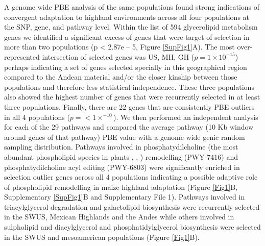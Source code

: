 \documentclass[9pt,twocolumn,twoside,lineno]{gsajnl}
\begin{document}
A genome wide PBE analysis of the same populations \cite{Wang2020-mp} found strong indications of convergent adaptation to highland environments across all four populations at the SNP, gene, and pathway level.
Within the list of 594 glycerolipid metabolism genes we identified a significant excess of genes that were target of selection in more than two populations (p < 2.87e – 5, Figure \ref{SupFig1}A).  
The most over-represented intersection of selected genes was US, MH, GH ($p = 1  \times 10 ^{-15} $) perhaps indicating a set of genes selected specially in this geographical region compared to the Andean material and/or the closer kinship between those populations and therefore less statistical independence. 
These three populations also showed the highest number of genes that were recurrently selected in at least three populations.
Finally, there are 22 genes that are consistently PBE outliers in all 4 populations ($p =<1  \times  ^{-10}$). 
We then performed an independent analysis for each of the 29 pathways and compared the average pathway (10 Kb window around genes of that pathway) PBE value with a genome wide genic random sampling distribution. 
Pathways involved in phosphatydilcholine (the most abundant phospholipid species in plants \citep{Gu2017-nd}, \citep{Poincelot1976-qe}, \citep{Hawke1974-ab}) remodelling (PWY-7416) and phosphatydilcholine acyl editing (PWY-6803) were significantly enriched in selection outlier genes across all 4 populations indicating a possible adaptive role of phospholipid remodelling in maize highland adaptation (Figure \ref{Fig1}B, Supplementary \ref{SupFig1}B and Supplementary File 1). 
Pathways involved in triacylglycerol degradation and galactolipid biosynthesis were recurrently selected in the SWUS, Mexican Highlands and the Andes while others involved in sulpholipid and diacylglycerol and phosphatidylglycerol biosynthesis were selected in the SWUS and mesoamerican populations (Figure \ref{Fig1}B).  
\end{document}
